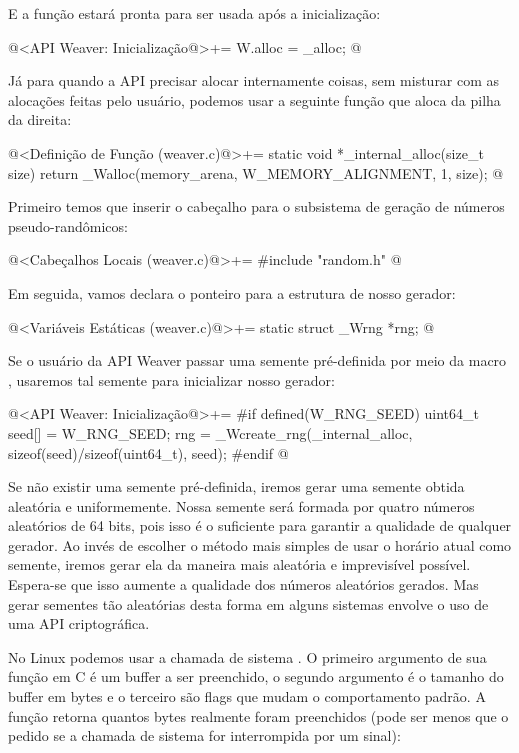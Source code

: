 E a função estará pronta para ser usada após a inicialização:

\iniciocodigo
@<API Weaver: Inicialização@>+=
W.alloc = _alloc;
@
\fimcodigo

Já para quando a API precisar alocar internamente coisas, sem misturar
com as alocações feitas pelo usuário, podemos usar a seguinte função
que aloca da pilha da direita:

\iniciocodigo
@<Definição de Função (weaver.c)@>+=
static void *_internal_alloc(size_t size){
  return _Walloc(memory_arena, W_MEMORY_ALIGNMENT, 1, size);
}
@
\fimcodigo


Primeiro temos que inserir o cabeçalho para o subsistema de geração de
números pseudo-randômicos:

\iniciocodigo
@<Cabeçalhos Locais (weaver.c)@>+=
#include "random.h"
@
\fimcodigo

Em seguida, vamos declara o ponteiro para a estrutura de nosso
gerador:

\iniciocodigo
@<Variáveis Estáticas (weaver.c)@>+=
static struct _Wrng *rng;
@
\fimcodigo

Se o usuário da API Weaver passar uma semente pré-definida por meio da
macro , usaremos tal semente para inicializar
nosso gerador:

\iniciocodigo
@<API Weaver: Inicialização@>+=
#if defined(W_RNG_SEED)
{
  uint64_t seed[] = W_RNG_SEED;
  rng = _Wcreate_rng(_internal_alloc, sizeof(seed)/sizeof(uint64_t),
                     seed);
}
#endif
@
\fimcodigo

Se não existir uma semente pré-definida, iremos gerar uma semente
obtida aleatória e uniformemente. Nossa semente será formada por
quatro números aleatórios de 64 bits, pois isso é o suficiente para
garantir a qualidade de qualquer gerador. Ao invés de escolher o
método mais simples de usar o horário atual como semente, iremos gerar
ela da maneira mais aleatória e imprevisível possível. Espera-se que
isso aumente a qualidade dos números aleatórios gerados. Mas gerar
sementes tão aleatórias desta forma em alguns sistemas envolve o uso
de uma API criptográfica.

No Linux podemos usar a chamada de sistema . O
primeiro argumento de sua função em C é um buffer a ser preenchido, o
segundo argumento é o tamanho do buffer em bytes e o terceiro são
flags que mudam o comportamento padrão. A função retorna quantos bytes
realmente foram preenchidos (pode ser menos que o pedido se a chamada
de sistema for interrompida por um sinal):

